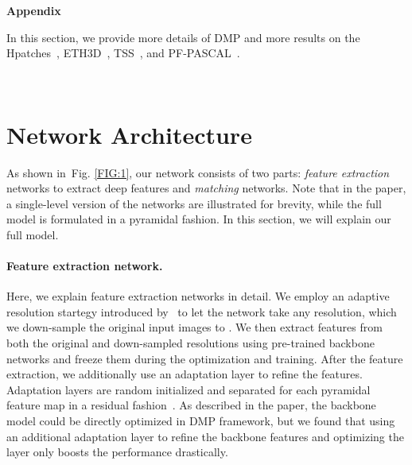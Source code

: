 \documentclass[10pt,twocolumn,letterpaper]{article}
\newcommand{\figref}[1]{Fig. \ref{#1}}
\begin{document}
{\small


}
\newpage
\clearpage
\appendix
\begin{center}
	\textbf{\Large Appendix}
\end{center}
\renewcommand\thesection{\Alph{section}}
\renewcommand{\thefigure}{\arabic{figure}}\renewcommand{\theHfigure}{A\arabic{figure}}\setcounter{figure}{0}
In this section, we provide more details of DMP and more results on the Hpatches~\cite{balntas2017hpatches}, ETH3D~\cite{schops2017multi}, TSS~\cite{taniai2016joint}, and PF-PASCAL~\cite{ham2016proposal}.

\begin{figure*}[t!]
	\centering
	\renewcommand{\thesubfigure}{}
	\\
	\vspace{-10pt}
\caption{\textbf{Overview of DMP architecture.} Overview of our proposed iterative architecture, which consists of feature extraction network and matching network. Source and target images are first fed into feature backbone network to obtain deep features. Each pyramidal features are then fed into adaptation layers and the refined features are obtained. Subsequently, the refined features are fed into a matching network and the estimated flow is up-sampled to warp the next level feature. The final output consists of refined features from target image and the flow field of size . }	\label{FIG:1}
\end{figure*}

\section{Network Architecture}\label{sec:1}
As shown in~\figref{FIG:1}, our network consists of two parts: {\it feature extraction} networks to extract deep features and {\it matching} networks. 
Note that in the paper, a single-level version of the networks are
illustrated for brevity, while the full model is formulated in a pyramidal fashion. In this section, we will explain our full model. \vspace{-10pt}

\paragraph{Feature extraction network.} Here, we explain feature extraction networks in detail. We employ an adaptive resolution startegy introduced by~\cite{truong2020glu} to let the network take any resolution, which we down-sample the original input images to .  We then extract features from both the original and down-sampled resolutions using pre-trained backbone networks and freeze them during the optimization and training. After the feature extraction, we additionally use an adaptation layer to refine the features. Adaptation layers are random initialized and separated for each pyramidal feature map in a residual fashion~\cite{he2016deep}. 
As described in the paper, the backbone model could be directly optimized in DMP framework, but we found that using an additional
adaptation layer to refine the backbone features and optimizing the layer only boosts the performance drastically.
\end{document}
